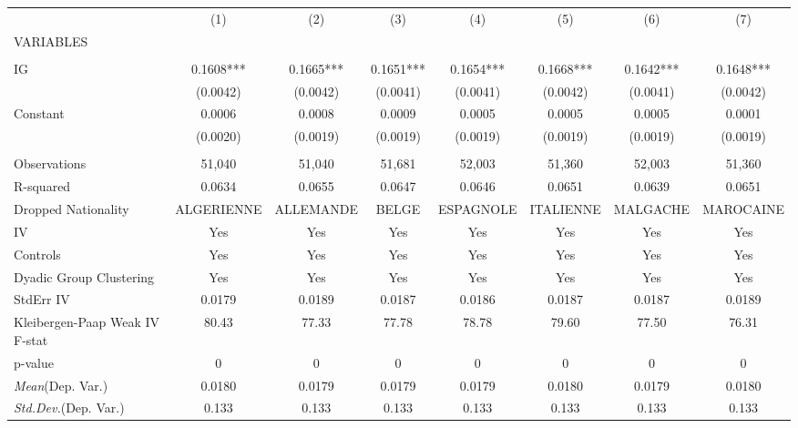 \documentclass[]{article}
\begin{document}
\begin{tabular}{lccccccc} \hline
 & (1) & (2) & (3) & (4) & (5) & (6) & (7) \\
VARIABLES &  &  &  &  &  &  &  \\ \hline
 &  &  &  &  &  &  &  \\
IG & 0.1608*** & 0.1665*** & 0.1651*** & 0.1654*** & 0.1668*** & 0.1642*** & 0.1648*** \\
 & (0.0042) & (0.0042) & (0.0041) & (0.0041) & (0.0042) & (0.0041) & (0.0042) \\
Constant & 0.0006 & 0.0008 & 0.0009 & 0.0005 & 0.0005 & 0.0005 & 0.0001 \\
 & (0.0020) & (0.0019) & (0.0019) & (0.0019) & (0.0019) & (0.0019) & (0.0019) \\
 &  &  &  &  &  &  &  \\
Observations & 51,040 & 51,040 & 51,681 & 52,003 & 51,360 & 52,003 & 51,360 \\
R-squared & 0.0634 & 0.0655 & 0.0647 & 0.0646 & 0.0651 & 0.0639 & 0.0651 \\
Dropped Nationality & ALGERIENNE & ALLEMANDE & BELGE & ESPAGNOLE & ITALIENNE & MALGACHE & MAROCAINE \\
IV & Yes & Yes & Yes & Yes & Yes & Yes & Yes \\
Controls & Yes & Yes & Yes & Yes & Yes & Yes & Yes \\
Dyadic Group Clustering & Yes & Yes & Yes & Yes & Yes & Yes & Yes \\
StdErr IV & 0.0179 & 0.0189 & 0.0187 & 0.0186 & 0.0187 & 0.0187 & 0.0189 \\
Kleibergen-Paap Weak IV F-stat & 80.43 & 77.33 & 77.78 & 78.78 & 79.60 & 77.50 & 76.31 \\
p-value & 0 & 0 & 0 & 0 & 0 & 0 & 0 \\
\textit{Mean}(Dep. Var.) & 0.0180 & 0.0179 & 0.0179 & 0.0179 & 0.0180 & 0.0179 & 0.0180 \\
 \textit{Std.Dev.}(Dep. Var.) & 0.133 & 0.133 & 0.133 & 0.133 & 0.133 & 0.133 & 0.133 \\ \hline
\end{tabular}
\end{document}
